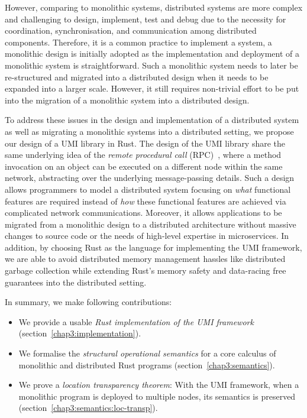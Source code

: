 However, comparing to monolithic systems, distributed systems are more complex and challenging to design, implement, test and debug due to the necessity for coordination, synchronisation, and communication among distributed components. Therefore, it is a common practice to implement a system, a monolithic design is initially adopted as the implementation and deployment of a monolithic system is straightforward. Such a monolithic system needs to later be re-structured and migrated into a distributed design when it needs to be expanded into a larger scale. However, it still requires non-trivial effort to be put into the migration of a monolithic system into a distributed design.

To address these issues in the design and implementation of a distributed system as well as migrating a monolithic systems into a distributed setting, we propose our design of a UMI library in Rust. The design of the UMI library share the same underlying idea of the \emph{remote procedural call} (RPC)~\citep{10.5555/910306}, where a method invocation on an object can be executed on a different node within the same network, abstracting over the underlying message-passing details. Such a design allows programmers to model a distributed system focusing on \emph{what} functional features are required instead of \emph{how} these functional features are achieved via complicated network communications. Moreover, it allows applications to be migrated from a monolithic design to a distributed architecture without massive changes to source code or the needs of high-level expertise in microservices. In addition, by choosing Rust as the language for implementing the UMI framework, we are able to avoid distributed memory management hassles like distributed garbage collection while extending Rust's memory safety and data-racing free guarantees into the distributed setting.

In summary, we make following contributions:
\begin{itemize}
    \item We provide a usable \emph{Rust implementation of the UMI framework} (section~\ref{chap3:implementation}).
    \item We formalise the \emph{structural operational semantics} for a core calculus of monolithic and distributed Rust programs (section~\ref{chap3:semantics}).
    \item We prove a \emph{location transparency theorem}: With the UMI framework, when a monolithic program is deployed to multiple nodes, its semantics is preserved (section~\ref{chap3:semantics:loc-transp}).
\end{itemize}

